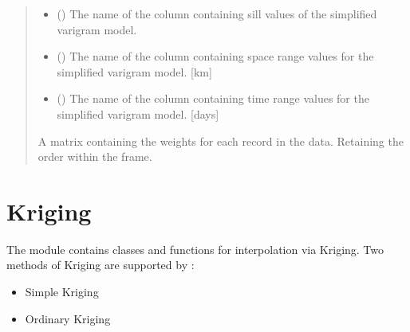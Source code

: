 \documentclass[letterpaper,10pt,english]{sphinxmanual}
\begin{document}
\begin{fulllineitems}
\begin{quote}
\begin{description}
\begin{itemize}
\item {}
\sphinxAtStartPar
{} () \textendash{} The name of the column containing sill values of the simplified varigram
model.

\item {}
\sphinxAtStartPar
{} () \textendash{} The name of the column containing space range values for the simplified
varigram model. {[}km{]}

\item {}
\sphinxAtStartPar
{} () \textendash{} The name of the column containing time range values for the simplified
varigram model. {[}days{]}

\end{itemize}

\sphinxAtStartPar
{} \textendash{} A matrix containing the weights for each record in the data.
Retaining the order within the frame.

\sphinxAtStartPar
{}

\end{description}\end{quote}

\end{fulllineitems}


\sphinxstepscope


\chapter{Kriging}
\label{\detokenize{kriging:kriging}}\label{\detokenize{kriging::doc}}
\sphinxAtStartPar
The  module contains classes and functions for interpolation via Kriging.
Two methods of Kriging are supported by :
\begin{itemize}
\item {}
\sphinxAtStartPar
Simple Kriging

\item {}
\sphinxAtStartPar
Ordinary Kriging

\end{itemize}
\end{document}
